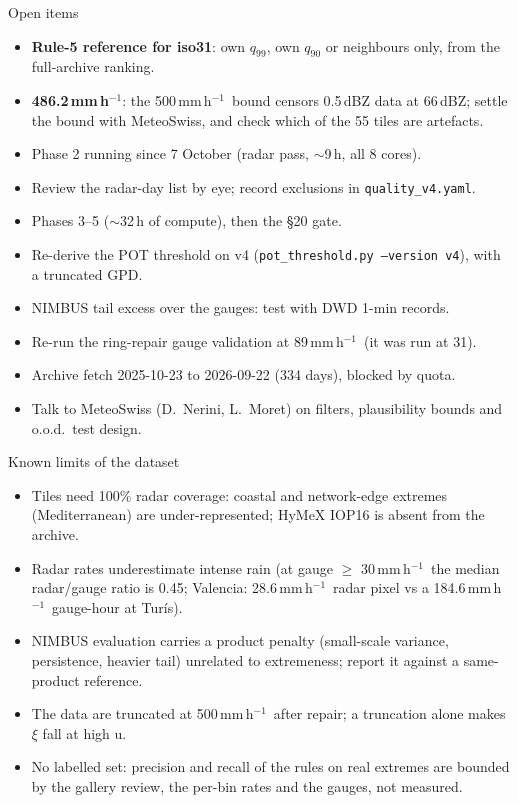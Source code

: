 \documentclass[aspectratio=169,10pt]{beamer}
\newcommand{\mmh}{\,mm\,h$^{-1}$}
\newcommand{\code}[1]{\texttt{\small #1}}
\begin{document}
\begin{frame}{Open items}
  \small
  \begin{itemize}
    \item \textbf{Rule-5 reference for iso31}: own $q_{99}$, own $q_{90}$ or neighbours only,
      from the full-archive ranking.
    \item \textbf{486.2\mmh}: the 500\mmh\ bound censors 0.5\,dBZ data at 66\,dBZ; settle the
      bound with MeteoSwiss, and check which of the 55 tiles are artefacts.
    \item Phase 2 running since 7 October (radar pass, $\sim$9\,h, all 8 cores).
    \item Review the radar-day list by eye; record exclusions in \code{quality\_v4.yaml}.
    \item Phases 3--5 ($\sim$32\,h of compute), then the §20 gate.
    \item Re-derive the POT threshold on v4 (\code{pot\_threshold.py --version v4}), with a
      truncated GPD.
    \item NIMBUS tail excess over the gauges: test with DWD 1-min records.
    \item Re-run the ring-repair gauge validation at 89\mmh\ (it was run at 31).
    \item Archive fetch 2025-10-23 to 2026-09-22 (334 days), blocked by quota.
    \item Talk to MeteoSwiss (D.\ Nerini, L.\ Moret) on filters, plausibility bounds and
      o.o.d.\ test design.
  \end{itemize}
\end{frame}

\begin{frame}{Known limits of the dataset}
  \small
  \begin{itemize}
    \item Tiles need 100\% radar coverage: coastal and network-edge extremes (Mediterranean)
      are under-represented; HyMeX IOP16 is absent from the archive.
    \item Radar rates underestimate intense rain (at gauge $\ge$ 30\mmh\ the median radar/gauge ratio is 0.45;
      Valencia: 28.6\mmh\ radar pixel vs a 184.6\mmh\ gauge-hour at Turís).
    \item NIMBUS evaluation carries a product penalty (small-scale variance, persistence,
      heavier tail) unrelated to extremeness; report it against a same-product reference.
    \item The data are truncated at 500\mmh\ after repair; a truncation alone makes $\xi$ fall at
      high u.
    \item No labelled set: precision and recall of the rules on real extremes are bounded by
      the gallery review, the per-bin rates and the gauges, not measured.
  \end{itemize}
\end{frame}
\end{document}
